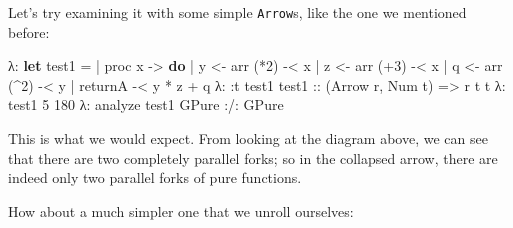 \documentclass[]{article}
\newenvironment{Shaded}{}{}
\newcommand{\DataTypeTok}[1]{\textcolor[rgb]{0.56,0.13,0.00}{#1}}
\newcommand{\DecValTok}[1]{\textcolor[rgb]{0.25,0.63,0.44}{#1}}
\newcommand{\KeywordTok}[1]{\textcolor[rgb]{0.00,0.44,0.13}{\textbf{#1}}}
\newcommand{\NormalTok}[1]{#1}
\newcommand{\OperatorTok}[1]{\textcolor[rgb]{0.40,0.40,0.40}{#1}}
\newcommand{\OtherTok}[1]{\textcolor[rgb]{0.00,0.44,0.13}{#1}}
\begin{document}
Let's try examining it with some simple \texttt{Arrow}s, like the one we
mentioned before:

\begin{Shaded}
\begin{Highlighting}[]
\NormalTok{λ}\OperatorTok{:} \KeywordTok{let}\NormalTok{ test1 }\OtherTok{=}
 \OperatorTok{|}\NormalTok{       proc x }\OtherTok{{-}\textgreater{}} \KeywordTok{do}
 \OperatorTok{|}\NormalTok{       y }\OtherTok{\textless{}{-}}\NormalTok{ arr (}\OperatorTok{*}\DecValTok{2}\NormalTok{) }\OperatorTok{{-}\textless{}}\NormalTok{ x}
 \OperatorTok{|}\NormalTok{       z }\OtherTok{\textless{}{-}}\NormalTok{ arr (}\OperatorTok{+}\DecValTok{3}\NormalTok{) }\OperatorTok{{-}\textless{}}\NormalTok{ x}
 \OperatorTok{|}\NormalTok{       q }\OtherTok{\textless{}{-}}\NormalTok{ arr (}\OperatorTok{\^{}}\DecValTok{2}\NormalTok{) }\OperatorTok{{-}\textless{}}\NormalTok{ y}
 \OperatorTok{|}\NormalTok{       returnA }\OperatorTok{{-}\textless{}}\NormalTok{ y }\OperatorTok{*}\NormalTok{ z }\OperatorTok{+}\NormalTok{ q}
\NormalTok{λ}\OperatorTok{:} \OperatorTok{:}\NormalTok{t test1}
\OtherTok{test1 ::}\NormalTok{ (}\DataTypeTok{Arrow}\NormalTok{ r, }\DataTypeTok{Num}\NormalTok{ t) }\OtherTok{=\textgreater{}}\NormalTok{ r t t}
\NormalTok{λ}\OperatorTok{:}\NormalTok{ test1 }\DecValTok{5}
\DecValTok{180}
\NormalTok{λ}\OperatorTok{:}\NormalTok{ analyze test1}
\DataTypeTok{GPure} \OperatorTok{:/:} \DataTypeTok{GPure}
\end{Highlighting}
\end{Shaded}

This is what we would expect. From looking at the diagram above, we can see that
there are two completely parallel forks; so in the collapsed arrow, there are
indeed only two parallel forks of pure functions.

How about a much simpler one that we unroll ourselves:
\end{document}

